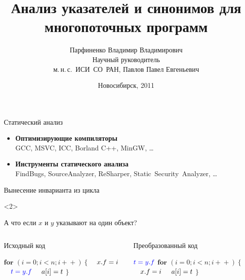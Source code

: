 \documentclass[usenames,dvipsnames,pdftex,unicode]{beamer}
\title[Анализ указателей и синонимов]{
  Анализ указателей и синонимов для многопоточных программ
}
\author[Парфиненко Владимир Владимирович]{
  Парфиненко Владимир Владимирович
  \texorpdfstring{%
    \\ \vspace{5mm} \small Научный руководитель\\ м.\,н.\,с.~ИСИ~СО~РАН, Павлов Павел
    Евгеньевич
  }{}%
}
\institute{
  Новосибирский Государственный Университет
}
\date{
  Новосибирск, 2011
}
\begin{document}
\begin{frame}
  \titlepage
\end{frame}

\begin{frame}{Статический анализ}

  \begin{itemize}
    \item \textbf{Оптимизирующие компиляторы}\\
        GCC, MSVC, ICC, Borland C++, MinGW, \ldots
    \item \textbf{Инструменты статического анализа}\\
        FindBugs, SourceAnalyzer, ReSharper, Static~Security~Analyzer, \ldots
  \end{itemize}

\end{frame}

\begin{frame}{Вынесение инварианта из цикла}

  \begin{visibleenv}<2>
    \begin{center}
      \large А что если $x$ и $y$ указывают на один объект?
    \end{center}
  \end{visibleenv}

  \begin{columns}[t]
    \begin{column}{5cm}
      \begin{block}{Исходный код}
        \begin{algorithmic}
          \STATE $\textbf{for }(i = 0; i < n; i\!+\!+)\ \{$
          \STATE $\text{\quad}x.f = i$
          \STATE $\text{\quad}\textcolor{blue}{t = y.f}$
          \STATE $\text{\quad}a[i] = t$
          \STATE $\}$
        \end{algorithmic}
      \end{block}
    \end{column}
    \begin{column}{5cm}
      \begin{block}{Преобразованный код}
        \begin{algorithmic}
          \STATE $\textcolor{blue}{t = y.f}$
          \STATE $\textbf{for }(i = 0; i < n; i\!+\!+)\ \{$
          \STATE $\text{\quad}x.f = i$
          \STATE $\text{\quad}a[i] = t$
          \STATE $\}$
        \end{algorithmic}
      \end{block}
    \end{column}
  \end{columns}

\end{frame}
\end{document}
